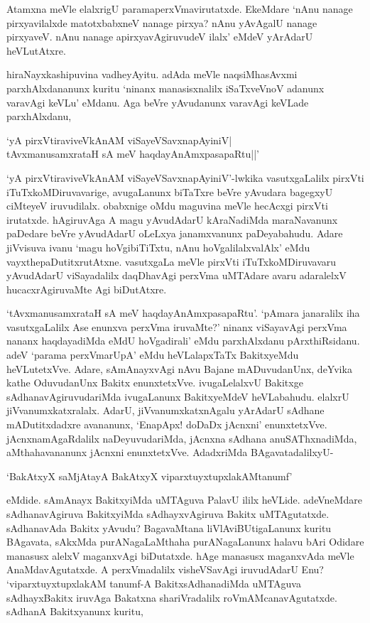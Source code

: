 Atamxna meVle elalxrigU paramaperxVmavirutatxde. EkeMdare `nAnu nanage pirxyavilalxde matotxbabxneV nanage pirxya? nAnu yAvAgalU 
nanage pirxyaveV. nAnu nanage apirxyavAgiruvudeV ilalx' eMdeV yArAdarU heVLutAtxre.

hiraNayxkashipuvina vadheyAyitu. adAda meVle naqsiMhasAvxmi parxhAlxdananunx kuritu `ninanx manasisxnalilx iSaTxveVnoV adanunx varavAgi 
keVLu' eMdanu. Aga beVre yAvudanunx varavAgi keVLade parxhAlxdanu,

\begin{shloka}
`yA pirxVtiraviveVkAnAM viSayeVSavxnapAyiniV|\\
tAvxmanusamxrataH sA meV haqdayAnAmx\s pasapaRtu||'
\end{shloka}

`yA pirxVtiraviveVkAnAM viSayeVSavxnapAyiniV'-lwkika vasutxgaLalilx pirxVti iTuTxkoMDiruvavarige, avugaLanunx biTaTxre beVre yAvudara bagegxyU ciMteyeV 
iruvudilalx. obabxnige oMdu maguvina meVle hecAcxgi pirxVti irutatxde. hAgiruvAga A magu yAvudAdarU kAraNadiMda maraNavanunx paDedare 
beVre yAvudAdarU oLeLxya janamxvanunx paDeyabahudu. Adare jiVvisuva ivanu `magu hoVgibiTiTxtu, nAnu hoVgalilalxvalAlx' eMdu vayxthepaDutitxrutAtxne. 
vasutxgaLa meVle pirxVti iTuTxkoMDiruvavaru yAvudAdarU viSayadalilx daqDhavAgi perxVma uMTAdare avaru adaralelxV hucacxrAgiruvaMte Agi biDutAtxre.

`tAvxmanusamxrataH sA meV haqdayAnAmx\s pasapaRtu'. `pAmara janaralilx iha vasutxgaLalilx Ase enunxva perxVma iruvaMte?' ninanx viSayavAgi perxVma nananx 
haqdayadiMda eMdU hoVgadirali' eMdu parxhAlxdanu pArxthiRsidanu. adeV `parama perxVmarUpA' eMdu heVLalapxTaTx BakitxyeMdu heVLutetxVve. 
Adare, sAmAnayxvAgi nAvu Bajane mADuvudanUnx, deYvika kathe OduvudanUnx Bakitx enunxtetxVve. ivugaLelalxvU Bakitxge sAdhanavAgiruvudariMda 
ivugaLanunx BakitxyeMdeV heVLabahudu. elalxrU jiVvanumxkatxralalx. AdarU, jiVvanumxkatxnAgalu yArAdarU sAdhane mADutitxdadxre avananunx, `EnapApx! doDaDx 
jAcnxni' enunxtetxVve. jAcnxnamAgaRdalilx naDeyuvudariMda, jAcnxna sAdhana anuSAThxnadiMda, aMthahavananunx jAcnxni enunxtetxVve. AdadxriMda BAgavatadalilxyU-

\begin{shloka}
`BakAtxyX saMjAtayA BakAtxyX viparxtuyxtupxlakAMtanumf'
\end{shloka}

eMdide. sAmAnayx BakitxyiMda uMTAguva PalavU ililx heVLide. adeVneMdare sAdhanavAgiruva BakitxyiMda sAdhayxvAgiruva Bakitx uMTAgutatxde. 
sAdhanavAda Bakitx yAvudu? BagavaMtana liVlAviBUtigaLanunx kuritu BAgavata, sAkxMda purANagaLaMthaha purANagaLanunx halavu bAri Odidare manasusx 
alelxV maganxvAgi biDutatxde. hAge manasusx maganxvAda meVle AnaMdavAgutatxde. A perxVmadalilx visheVSavAgi iruvudAdarU Enu? `viparxtuyxtupxlakAM 
tanumf-A BakitxsAdhanadiMda uMTAguva sAdhayxBakitx iruvAga Bakatxna shariVradalilx roVmAMcanavAgutatxde. sAdhanA Bakitxyanunx kuritu,

